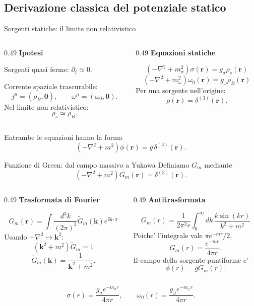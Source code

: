 \subsection{Derivazione classica del potenziale statico}

\begin{frame}{Sorgenti statiche: il limite non relativistico}
\small
\begin{columns}[T,onlytextwidth]
\begin{column}{0.49\textwidth}
\textbf{Ipotesi}\par\smallskip
Sorgenti quasi ferme: \(\partial_t\simeq0\).\par
Corrente spaziale trascurabile:
\[
j^\mu=(\rho_B,\mathbf0),\qquad
\omega^\mu=(\omega_0,\mathbf0).
\]
Nel limite non relativistico:
\[
\rho_s\simeq\rho_B.
\]
\end{column}
\begin{column}{0.49\textwidth}
\textbf{Equazioni statiche}\par\smallskip
\[
(-\nabla^2+m_\sigma^2)\sigma(\mathbf r)
=g_\sigma\rho_s(\mathbf r)
\]
\[
(-\nabla^2+m_\omega^2)\omega_0(\mathbf r)
=g_\omega\rho_B(\mathbf r)
\]
Per una sorgente nell'origine:
\[
\rho(\mathbf r)=\delta^{(3)}(\mathbf r).
\]
\end{column}
\end{columns}
\medskip
Entrambe le equazioni hanno la forma
\[
(-\nabla^2+m^2)\phi(\mathbf r)=g\,\delta^{(3)}(\mathbf r).
\]
\end{frame}

\begin{frame}{Funzione di Green: dal campo massivo a Yukawa}
\footnotesize
Definiamo \(G_m\) mediante
\[
(-\nabla^2+m^2)G_m(\mathbf r)=\delta^{(3)}(\mathbf r).
\]
\begin{columns}[T,onlytextwidth]
\begin{column}{0.49\textwidth}
\textbf{Trasformata di Fourier}\par\smallskip
\[
G_m(\mathbf r)=\int\frac{d^3k}{(2\pi)^3}
\widetilde G_m(\mathbf k)e^{i\mathbf k\cdot\mathbf r}
\]
Usando \(-\nabla^2\mapsto\mathbf k^2\):
\[
(\mathbf k^2+m^2)\widetilde G_m=1
\]
\[
\widetilde G_m(\mathbf k)
=\frac1{\mathbf k^2+m^2}.
\]
\end{column}
\begin{column}{0.49\textwidth}
\textbf{Antitrasformata}\par\smallskip
\[
G_m(r)=\frac1{2\pi^2r}
\int_0^\infty\!dk\,\frac{k\sin(kr)}{k^2+m^2}
\]
Poiche' l'integrale vale \(\pi e^{-mr}/2\),
\[
G_m(r)=\frac{e^{-mr}}{4\pi r}.
\]
Il campo della sorgente puntiforme e'
\[
\phi(r)=gG_m(r).
\]
\end{column}
\end{columns}
\medskip
\[
\sigma(r)=\frac{g_\sigma e^{-m_\sigma r}}{4\pi r},
\qquad
\omega_0(r)=\frac{g_\omega e^{-m_\omega r}}{4\pi r}.
\]
\end{frame}

